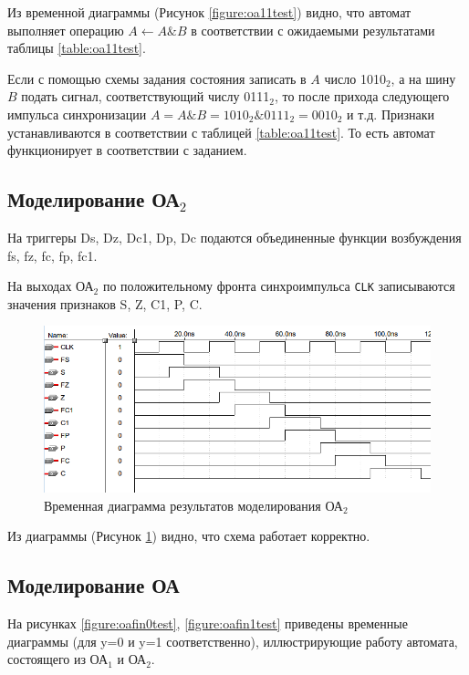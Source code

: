 Из временной диаграммы (Рисунок \ref{figure:oa11test}) видно, что автомат выполняет операцию $A \leftarrow A \& B$ в соответствии с ожидаемыми результатами таблицы \ref{table:oa11test}. 

Если с помощью схемы задания состояния записать в $A$ число 1010$_2$, а на шину $B$ подать сигнал, соответствующий числу 0111$_2$, то после прихода следующего импульса синхронизации $A = A \& B = 1010_2 \& 0111_2 = 0010_2$ и т.д. Признаки устанавливаются в соответствии с таблицей \ref{table:oa11test}. То есть автомат функционирует в соответствии с заданием.

\clearpage
\subsection{Моделирование ОА$_2$}

На триггеры Ds, Dz, Dc1, Dp, Dc подаются объединенные функции возбуждения fs, fz, fc, fp, fc1.

На выходах ОА$_2$ по положительному фронта синхроимпульса \texttt{CLK} записываются значения признаков S, Z, C1, P, C.

\begin{figure}[H]
	\includegraphics[scale=0.6]{images/altera/test2.png}
	\caption{Временная диаграмма результатов моделирования ОА$_2$}
	\label{figure:oa2test}
\end{figure}

Из диаграммы (Рисунок \ref{figure:oa2test}) видно, что схема работает корректно.

\clearpage
\subsection{Моделирование ОА}

На рисунках \ref{figure:oafin0test}, \ref{figure:oafin1test} приведены временные диаграммы (для y=0 и y=1 соответственно), иллюстрирующие работу автомата, состоящего из ОА$_1$ и ОА$_2$.

